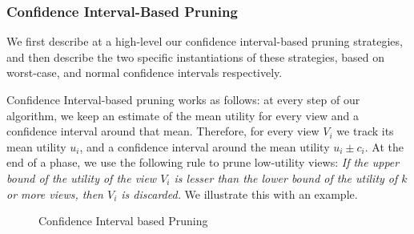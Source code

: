 \subsubsection{Confidence Interval-Based Pruning}
We first describe at a high-level our confidence interval-based pruning strategies,
and then describe the two specific instantiations of these strategies,
based on worst-case, and normal confidence intervals respectively.

Confidence Interval-based pruning works as follows: at every step of our
algorithm, we keep an estimate of the mean utility for every view and a
confidence interval around that mean.
Therefore, for every view $V_i$ we track its mean utility $u_i$, and a
confidence interval around the mean utility $u_i \pm c_i$.
At the end of a phase, we use the following rule to prune low-utility
views:
{\em If the upper bound of the utility of the view $V_i$ is lesser
than the lower bound of the utility of $k$ or more views, then $V_i$ is discarded.}
We illustrate this with an example. 

\begin{figure}[h]
\vspace{-10pt}
\centerline{
\hbox{}}
\vspace{-20pt}
\caption{Confidence Interval based Pruning}
\label{fig:conf_interval}
\vspace{-12pt}
\end{figure}

